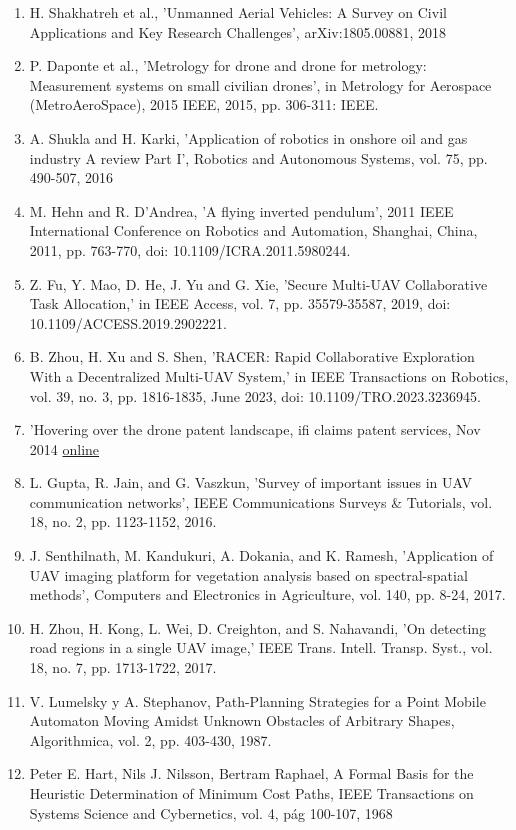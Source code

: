\documentclass[11pt,epsf,times]{article}
\begin{document}
\begin{enumerate}
\item  H. Shakhatreh et al., 'Unmanned Aerial Vehicles: A Survey on Civil Applications and Key Research Challenges', arXiv:1805.00881, 2018
\item P. Daponte et al., 'Metrology for drone and drone for metrology: Measurement systems on small civilian drones', in Metrology for Aerospace (MetroAeroSpace), 2015 IEEE, 2015, pp. 306-311: IEEE.
\item A. Shukla and H. Karki, 'Application of robotics in onshore oil and gas industry A review Part I', Robotics and Autonomous Systems, vol. 75, pp. 490-507, 2016
\item M. Hehn and R. D'Andrea, 'A flying inverted pendulum', 2011 IEEE International Conference on Robotics and Automation, Shanghai, China, 2011, pp. 763-770, doi: 10.1109/ICRA.2011.5980244.
\item Z. Fu, Y. Mao, D. He, J. Yu and G. Xie, 'Secure Multi-UAV Collaborative Task Allocation,' in IEEE Access, vol. 7, pp. 35579-35587, 2019, doi: 10.1109/ACCESS.2019.2902221.
\item B. Zhou, H. Xu and S. Shen, 'RACER: Rapid Collaborative Exploration With a Decentralized Multi-UAV System,' in IEEE Transactions on Robotics, vol. 39, no. 3, pp. 1816-1835, June 2023, doi: 10.1109/TRO.2023.3236945.
\item 'Hovering over the drone patent landscape, ifi claims patent services, Nov 2014 \href{https://www.ificlaims.com/news/view/blog-posts/hovering-over-the-drone.htm}{online}
\item L. Gupta, R. Jain, and G. Vaszkun, 'Survey of important issues in UAV communication networks', IEEE Communications Surveys \& Tutorials, vol. 18, no. 2, pp. 1123-1152, 2016.
\item J. Senthilnath, M. Kandukuri, A. Dokania, and K. Ramesh, 'Application of UAV imaging platform for vegetation analysis based on spectral-spatial methods', Computers and Electronics in Agriculture, vol. 140, pp. 8-24, 2017.
\item H. Zhou, H. Kong, L. Wei, D. Creighton, and S. Nahavandi, 'On detecting road regions in a single UAV image,' IEEE Trans. Intell. Transp. Syst., vol. 18, no. 7, pp. 1713-1722, 2017.
\item V. Lumelsky y A. Stephanov, Path-Planning Strategies for a Point Mobile Automaton Moving Amidst Unknown Obstacles of Arbitrary Shapes, Algorithmica, vol. 2, pp. 403-430, 1987.
\item Peter E. Hart, Nils J. Nilsson, Bertram Raphael, A Formal Basis for the Heuristic Determination of Minimum Cost Paths, IEEE Transactions on Systems Science and Cybernetics, vol. 4, pág 100-107, 1968

\end{enumerate}
\end{document}
